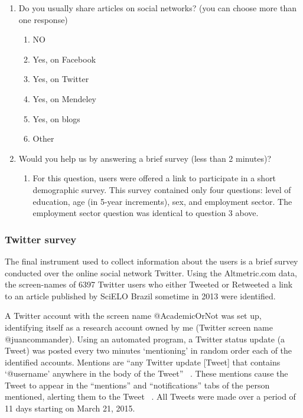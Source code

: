 \begin{enumerate}[label=Q{\arabic*}:,nosep]
    \item
        Do you usually share articles on social networks? (you can choose more than one response)
        \begin{enumerate}[label={\alph*}),itemsep=0pt,parsep=0pt]
            \item
                NO
            \item
                Yes, on Facebook
            \item
                Yes, on Twitter
            \item
                Yes, on Mendeley
            \item
                Yes, on blogs
            \item
                Other
        \end{enumerate}
    \item
        Would you help us by answering a brief survey (less than 2 minutes)?
        \begin{enumerate}[label={},itemsep=0pt,parsep=0pt]
            \item
                For this question, users were offered a link to participate in a short demographic survey. This survey contained only four questions: level of education, age (in 5-year increments), sex, and employment sector. The employment sector question was identical to question 3 above.
        \end{enumerate}
\end{enumerate}



\subsubsection{Twitter survey}
\label{twittersurvey}

The final instrument used to collect information about the users is a brief survey conducted over the online social network Twitter. Using the Altmetric.com data, the screen-names of 6397 Twitter users who either Tweeted or Retweeted a link to an article published by SciELO Brazil sometime in 2013 were identified.

A Twitter account with the screen name @AcademicOrNot was set up, identifying itself as a research account owned by me (Twitter screen name @juancommander). Using an automated program, a Twitter status update (a Tweet) was posted every two minutes `mentioning' in random order each of the identified accounts. Mentions are ``any Twitter update [Tweet] that contains `@username' anywhere in the body of the Tweet'' ~\citep[n.p.]{Twitter2015}. These mentions cause the Tweet to appear in the ``mentions'' and ``notifications'' tabs of the person mentioned, alerting them to the Tweet ~\citep{Twitter2015}. All Tweets were made over a period of 11 days starting on March 21, 2015.

